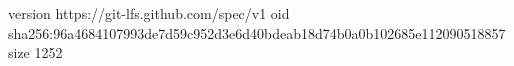 version https://git-lfs.github.com/spec/v1
oid sha256:96a4684107993de7d59c952d3e6d40bdeab18d74b0a0b102685e112090518857
size 1252

